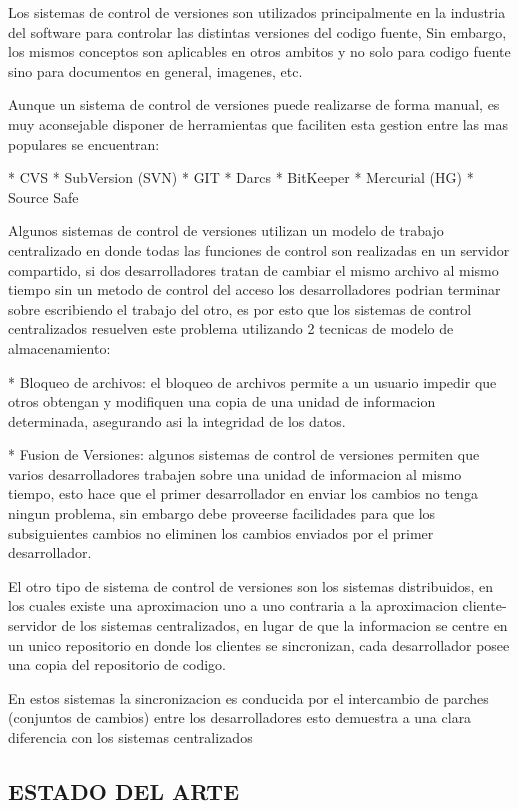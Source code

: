 Los sistemas de control de versiones son utilizados principalmente en la industria del software para controlar las distintas versiones del codigo fuente, Sin embargo, los mismos conceptos son aplicables en otros ambitos y no solo para codigo fuente sino para documentos en general, imagenes, etc.

Aunque un sistema de control de versiones puede realizarse de forma manual, es muy aconsejable disponer de herramientas que faciliten esta gestion entre las mas populares se encuentran:

* CVS
* SubVersion (SVN)
* GIT
* Darcs
* BitKeeper
* Mercurial (HG)
* Source Safe

Algunos sistemas de control de versiones utilizan un modelo de trabajo centralizado en donde todas las funciones de control son realizadas en un servidor compartido, si dos desarrolladores tratan de cambiar el mismo archivo al mismo tiempo sin un metodo de control del acceso los desarrolladores podrian terminar sobre escribiendo el trabajo del otro, es por esto que los sistemas de control centralizados resuelven este problema utilizando 2 tecnicas de modelo de almacenamiento:

* Bloqueo de archivos: el bloqueo de archivos permite a un usuario impedir que otros obtengan y modifiquen una copia de una unidad de informacion determinada, asegurando asi la integridad de los datos.

* Fusion de Versiones: algunos sistemas de control de versiones permiten que varios desarrolladores trabajen sobre una unidad de informacion al mismo tiempo, esto hace que el primer desarrollador en enviar los cambios no tenga ningun problema, sin embargo debe proveerse facilidades para que los subsiguientes cambios no eliminen los cambios enviados por el primer desarrollador.

El otro tipo de sistema de control de versiones son los sistemas distribuidos, en los cuales existe una aproximacion uno a uno contraria a la aproximacion cliente-servidor de los sistemas centralizados, en lugar de que la informacion se centre en un unico repositorio en donde los clientes se sincronizan, cada desarrollador posee una copia del repositorio de codigo.

En estos sistemas la sincronizacion es conducida por el intercambio de parches (conjuntos de cambios) entre los desarrolladores esto demuestra a una clara diferencia con los sistemas centralizados


\subsection{ESTADO DEL ARTE}

